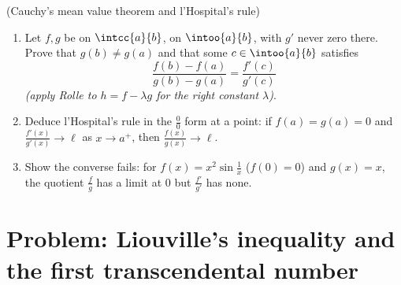 \begin{exercise}[$\star\star\star$]\label{exo:b1:derivative:12}
(Cauchy's mean value theorem and l'Hospital's rule)
\begin{enumerate}
  \item Let $f, g$ be  on $\intcc{a}{b}$,
         on $\intoo{a}{b}$, with $g'$ never zero
        there. Prove that $g(b) \neq g(a)$ and that some $c \in
        \intoo{a}{b}$ satisfies
        \[
        \frac{f(b) - f(a)}{g(b) - g(a)} = \frac{f'(c)}{g'(c)}
        \]
        \emph{(apply Rolle to $h = f - \lambda g$ for the right
        constant $\lambda$)}.
  \item Deduce l'Hospital's rule in the $\frac00$ form at a
        point: if $f(a) = g(a) = 0$ and
        $\frac{f'(x)}{g'(x)} \to \ell$ as $x \to a^+$, then
        $\frac{f(x)}{g(x)} \to \ell$.
  \item Show the converse fails: for $f(x) = x^2\sin\frac1x$
        ($f(0) = 0$) and $g(x) = x$, the quotient
        $\frac{f}{g}$ has a limit at $0$ but
        $\frac{f'}{g'}$ has none.
\end{enumerate}
\end{exercise}

\section{Problem: Liouville's inequality and the first
transcendental number}

